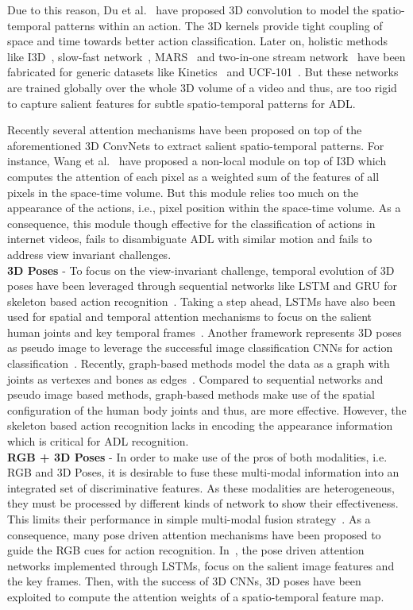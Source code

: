 \documentclass[runningheads]{llncs}
\begin{document}
 Due to this reason, Du et al.~\cite{C3D} have proposed 3D convolution to model the spatio-temporal patterns within an action. The 3D kernels provide tight coupling of space and time towards better action classification. 
Later on, holistic methods like I3D~\cite{i3d}, slow-fast network~\cite{slow_fast}, MARS~\cite{mars} and two-in-one stream network~\cite{dance_with_flow} have been fabricated for generic datasets like Kinetics~\cite{kinetics} and UCF-101~\cite{ucf}.
But these networks are trained globally over the whole 3D volume of a video and thus, are too rigid to capture salient features for subtle spatio-temporal patterns for ADL. 

 Recently several attention mechanisms have been proposed on top of the aforementioned 3D ConvNets to extract salient spatio-temporal patterns. For instance, Wang et al.~\cite{nonlocal} have proposed a non-local module on top of I3D which computes the attention of each pixel as a weighted sum of the features of all pixels in the space-time volume. But this module relies too much on the appearance of the actions, i.e., pixel position within the space-time volume. As a consequence, this module though effective for the classification of actions in internet videos, fails to disambiguate ADL with similar motion and fails to address view invariant challenges. \\
\textbf{3D Poses} - To focus on the view-invariant challenge, temporal evolution of 3D poses have been leveraged through sequential networks like LSTM and GRU for skeleton based action recognition~\cite{gemetricfeaturesWACV2017,st-lstm,valstm}. Taking a step ahead, LSTMs have also been used for spatial and temporal attention mechanisms to focus on the salient human joints and key temporal frames~\cite{sta_lstm}. Another framework represents 3D poses as pseudo image to leverage the successful image classification CNNs for action classification~\cite{skel_CNN_1,skel_CNN_2}. Recently, graph-based methods model the data as a graph with joints as vertexes and bones as edges~\cite{stgcn2018aaai,deep-progressive,directed_graph}. Compared to sequential networks and pseudo image based methods, graph-based methods make use of the spatial configuration of the human body joints and thus, are more effective. However, the skeleton based action recognition lacks in encoding the appearance information which is critical for ADL recognition. \\
\textbf{RGB + 3D Poses} - In order to make use of the pros of both modalities, i.e. RGB and 3D Poses, it is desirable to fuse these multi-modal information into an integrated set of discriminative features. As these modalities are heterogeneous, they must be processed by different kinds of network to show their effectiveness. This limits their performance in simple multi-modal fusion strategy~\cite{rgb+pose_1,rgb+pose_2,Luo_2018_ECCV}. As a consequence, many pose driven attention mechanisms have been proposed to guide the RGB cues for action recognition. In~\cite{STA-hands,Baradel_BMVC,glimpse}, the pose driven attention networks implemented through LSTMs, focus on the salient image features and the key frames. Then, with the success of 3D CNNs, 3D poses have been exploited to compute the attention weights of a spatio-temporal feature map.
\end{document}
